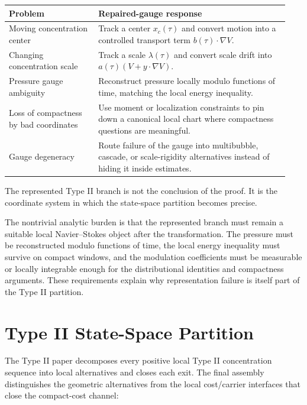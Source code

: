 \documentclass[11pt]{amsart}
\begin{document}
\begin{longtable}{@{}>{\raggedright\arraybackslash}p{0.30\linewidth}>{\raggedright\arraybackslash}p{0.64\linewidth}@{}}
\toprule
\textbf{Problem} & \textbf{Repaired-gauge response} \\
\midrule
\endhead
Moving concentration center & Track a center \(x_c(\tau)\) and convert motion into a controlled transport term \(b(\tau)\cdot\nabla V\). \\
Changing concentration scale & Track a scale \(\lambda(\tau)\) and convert scale drift into \(a(\tau)(V+y\cdot\nabla V)\). \\
Pressure gauge ambiguity & Reconstruct pressure locally modulo functions of time, matching the local energy inequality. \\
Loss of compactness by bad coordinates & Use moment or localization constraints to pin down a canonical local chart where compactness questions are meaningful. \\
Gauge degeneracy & Route failure of the gauge into multibubble, cascade, or scale-rigidity alternatives instead of hiding it inside estimates. \\
\bottomrule
\end{longtable}

The represented Type II branch is not the conclusion of the proof.  It is the coordinate system in which the state-space partition becomes precise.

The nontrivial analytic burden is that the represented branch must remain a suitable local Navier--Stokes object after the transformation.  The pressure must be reconstructed modulo functions of time, the local energy inequality must survive on compact windows, and the modulation coefficients must be measurable or locally integrable enough for the distributional identities and compactness arguments.  These requirements explain why representation failure is itself part of the Type II partition.

\section{Type II State-Space Partition}

The Type II paper decomposes every positive local Type II concentration sequence into local alternatives and closes each exit.  The final assembly distinguishes the geometric alternatives from the local cost/carrier interfaces that close the compact-cost channel:
\end{document}
